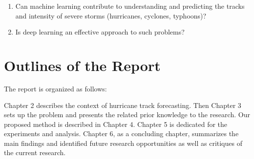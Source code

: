 \begin{enumerate}[label=\zdyxh*., leftmargin=5em]
	\item  Can machine learning contribute to understanding and predicting the tracks and intensity of severe storms (hurricanes, cyclones, typhoons)? 
	\item Is deep learning an effective approach to such problems?
\end{enumerate}




\section{Outlines of  the Report}
The report is organized as follows:

Chapter 2 describes the context of hurricane track forecasting. Then Chapter 3 sets up the problem and presents the related prior knowledge to the research. Our proposed method is described in Chapter 4. Chapter 5 is dedicated for the experiments and analysis. Chapter 6, as a concluding chapter, summarizes the main findings and identified future research opportunities as well as critiques of the current research.


